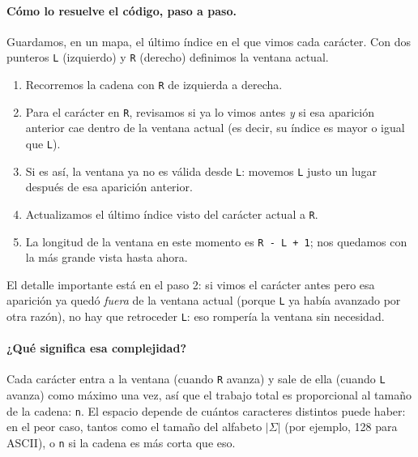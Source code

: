 \paragraph{Cómo lo resuelve el código, paso a paso.} Guardamos, en un mapa,
el último índice en el que vimos cada carácter. Con dos punteros \texttt{L}
(izquierdo) y \texttt{R} (derecho) definimos la ventana actual.
\begin{enumerate}
  \item Recorremos la cadena con \texttt{R} de izquierda a derecha.
  \item Para el carácter en \texttt{R}, revisamos si ya lo vimos antes
        \emph{y} si esa aparición anterior cae dentro de la ventana actual
        (es decir, su índice es mayor o igual que \texttt{L}).
  \item Si es así, la ventana ya no es válida desde \texttt{L}: movemos
        \texttt{L} justo un lugar después de esa aparición anterior.
  \item Actualizamos el último índice visto del carácter actual a
        \texttt{R}.
  \item La longitud de la ventana en este momento es \texttt{R - L + 1};
        nos quedamos con la más grande vista hasta ahora.
\end{enumerate}
El detalle importante está en el paso 2: si vimos el carácter antes pero esa
aparición ya quedó \emph{fuera} de la ventana actual (porque \texttt{L} ya
había avanzado por otra razón), no hay que retroceder \texttt{L}: eso
rompería la ventana sin necesidad.




\paragraph{¿Qué significa esa complejidad?} Cada carácter entra a la
ventana (cuando \texttt{R} avanza) y sale de ella (cuando \texttt{L}
avanza) como máximo una vez, así que el trabajo total es proporcional al
tamaño de la cadena: \texttt{n}. El espacio depende de cuántos caracteres
distintos puede haber: en el peor caso, tantos como el tamaño del alfabeto
\texttt{$|\Sigma|$} (por ejemplo, 128 para ASCII), o \texttt{n} si la cadena
es más corta que eso.


